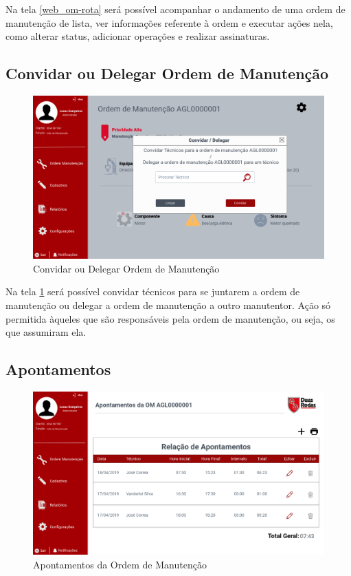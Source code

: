 {Na tela \ref{web_om-rota} será possível acompanhar o andamento de uma ordem de manutenção de lista, ver informações referente à ordem e executar ações nela, como alterar status, adicionar operações e realizar assinaturas.

\newpage
\subsection{Convidar ou Delegar Ordem de Manutenção}

\begin{figure}[htb]
	\caption{\label{web_om-convidar-delegar}Convidar ou Delegar Ordem de Manutenção}
	\begin{center}
		\includegraphics[scale=0.40]{./Figuras/web/om-convidar-delegar.png}
	\end{center}
\end{figure}

Na tela \ref{web_om-convidar-delegar} será possível convidar técnicos para se juntarem a ordem de manutenção ou delegar a ordem de manutenção a outro manutentor. Ação só permitida àqueles que são responsáveis pela ordem de manutenção, ou seja, os que assumiram ela.

\newpage
\subsection{Apontamentos}

\begin{figure}[htb]
	\caption{\label{web_om-apontamentos}Apontamentos da Ordem de Manutenção}
	\begin{center}
		\includegraphics[scale=0.40]{./Figuras/web/om-apontamentos.png}
	\end{center}
\end{figure}

}
